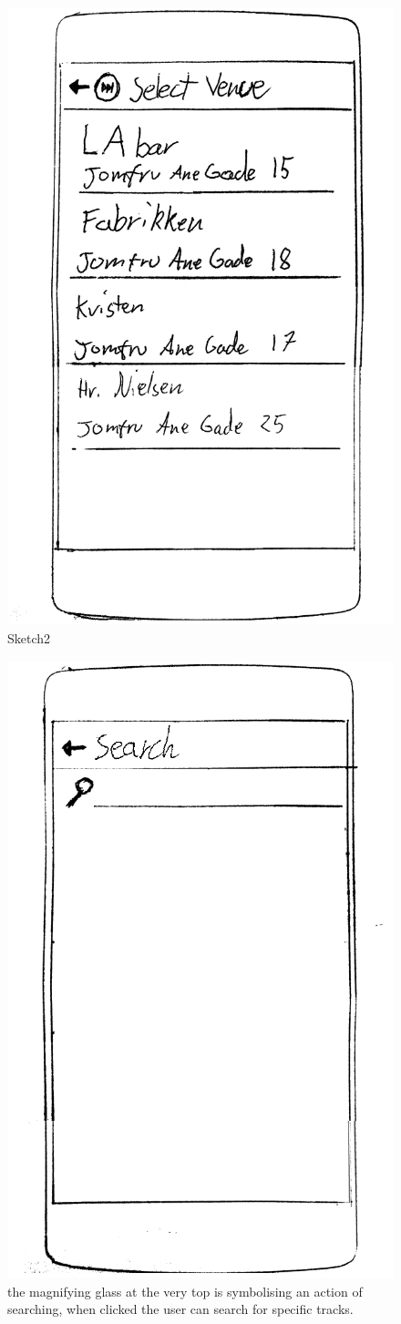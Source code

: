 \begin{figure}
  \centering
  \includegraphics[width=0.5\linewidth]{Images/sketch2.png}
  \caption{Sketch2}
  \label{fig:VenueSketch}
\end{figure}


\begin{figure}
  \centering
  \includegraphics[width=0.5\linewidth]{Images/sketch4.png}
  \caption{the magnifying glass at the very top is symbolising an action of searching, when clicked the user can search for specific tracks.}
  \label{fig:BrowseSketch}
\end{figure}

